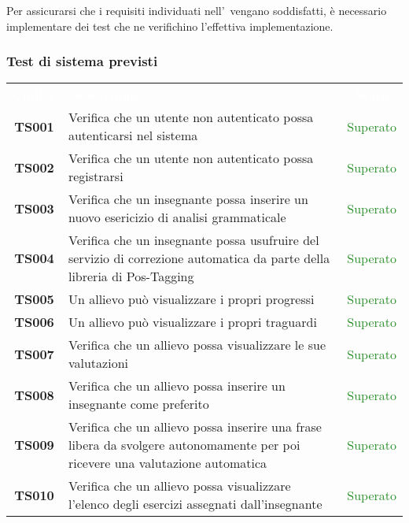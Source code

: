 Per assicurarsi che i requisiti individuati nell'\AdR \ vengano soddisfatti, è necessario implementare dei test che ne verifichino l'effettiva implementazione.

\subsubsection{Test di sistema previsti}

\begin{tabularx}{\textwidth}{cXc}
	
	\rowcolor{greySWEight}
	
	\rowcolor{greySWEight}
	\textcolor{white}{\textbf{Codice}} & 
	\textcolor{white}{\textbf{Descrizione}} &
	\textcolor{white}{\textbf{Stato}} \\
	
	\textbf{TS001} & Verifica che un utente non autenticato possa autenticarsi nel sistema & \textcolor{ForestGreen}{Superato} \\
	\textbf{TS002} & Verifica che un utente non autenticato possa registrarsi & \textcolor{ForestGreen}{Superato} \\
	\textbf{TS003} & Verifica che un insegnante possa inserire un nuovo esericizio di analisi grammaticale & \textcolor{ForestGreen}{Superato} \\
	\textbf{TS004} & Verifica che un insegnante possa usufruire del servizio di
	correzione automatica da parte della libreria di Pos-Tagging & \textcolor{ForestGreen}{Superato} \\
	\textbf{TS005} & Un allievo può visualizzare i propri progressi & \textcolor{ForestGreen}{Superato} \\
	\textbf{TS006} & Un allievo può visualizzare i propri traguardi & \textcolor{ForestGreen}{Superato} \\
	\textbf{TS007} & Verifica che un allievo possa visualizzare le sue valutazioni & \textcolor{ForestGreen}{Superato} \\
	\textbf{TS008} & Verifica che un allievo possa inserire un insegnante come preferito & \textcolor{ForestGreen}{Superato} \\
	\textbf{TS009} & Verifica che un allievo possa inserire una frase libera da svolgere autonomamente per poi ricevere
	una valutazione automatica & \textcolor{ForestGreen}{Superato} \\
	\textbf{TS010} & Verifica che un allievo possa visualizzare l’elenco degli
	esercizi assegnati dall’insegnante & \textcolor{ForestGreen}{Superato} \\

\end{tabularx}
